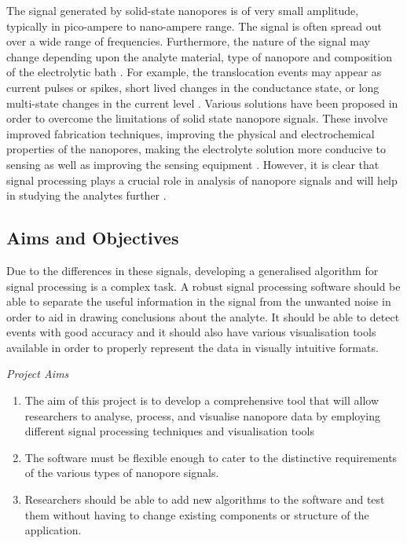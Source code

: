 \documentclass[journal]{IEEEtran}
\begin{document}
The signal generated by solid-state nanopores is of very small amplitude, typically in pico-ampere to nano-ampere range. The signal is often spread out over a wide range of frequencies. Furthermore, the nature of the signal may change depending upon the analyte material, type of nanopore and composition of the electrolytic bath \cite{gokhaleAdvancedSignalProcessing2023}. For example, the translocation events may appear as current pulses or spikes, short lived changes in the conductance state, or long multi-state changes in the current level \cite{forstaterMOSAICModularSingleMolecule2016,varongchayakulSinglemoleculeProteinSensing2018}. Various solutions have been proposed in order to overcome the limitations of solid state nanopore signals. These involve improved fabrication techniques, improving the physical and electrochemical properties of the nanopores, making the electrolyte solution more conducive to sensing as well as improving the sensing equipment \cite{chauMacromolecularCrowdingEnhances2020,gokhaleAdvancedSignalProcessing2023,milesSingleMoleculeSensing2012}. However, it is clear that signal processing plays a crucial role in analysis of nanopore signals and will help in studying the analytes further \cite{milesSingleMoleculeSensing2012,varongchayakulSinglemoleculeProteinSensing2018}.

\subsection{Aims and Objectives}
Due to the differences in these signals, developing a generalised algorithm for signal processing is a complex task. A robust signal processing software should be able to separate the useful information in the signal from the unwanted noise in order to aid in drawing conclusions about the analyte. It should be able to detect events with good accuracy and it should also have various visualisation tools available in order to properly represent the data in visually intuitive formats.

\noindent \textit{Project Aims}
\begin{enumerate}
\item {The aim of this project is to develop a comprehensive tool that will allow researchers to analyse, process, and visualise nanopore data by employing different signal processing techniques and visualisation tools \cite{gokhaleAdvancedSignalProcessing2023}}
\item {The software must be flexible enough to cater to the distinctive requirements of the various types of nanopore signals.}
\item {Researchers should be able to add new algorithms to the software and test them without having to change existing components or structure of the application.}
\end{enumerate}
\end{document}
